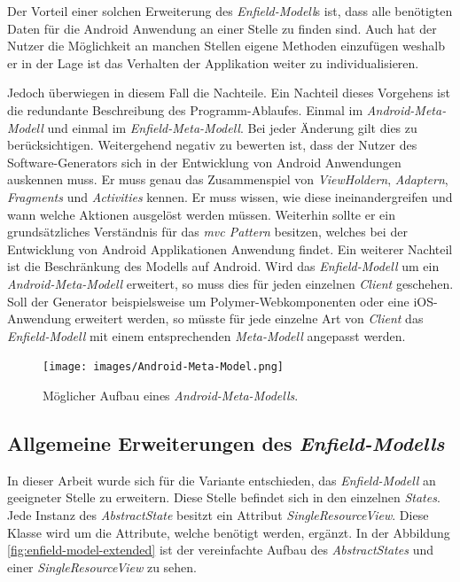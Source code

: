 \newpage

Der Vorteil einer solchen Erweiterung des \textit{Enfield-Modell}s ist, dass alle benötigten Daten für die Android Anwendung an einer Stelle zu finden sind. Auch hat der Nutzer die Möglichkeit an manchen Stellen eigene Methoden einzufügen weshalb er in der Lage ist das Verhalten der Applikation weiter zu individualisieren.

Jedoch überwiegen in diesem Fall die Nachteile. Ein Nachteil dieses Vorgehens ist die redundante Beschreibung des Programm-Ablaufes. Einmal im \textit{Android-Meta-Modell} und einmal im \textit{Enfield-Meta-Modell}. Bei jeder Änderung gilt dies zu berücksichtigen. 
Weitergehend negativ zu bewerten ist, dass der Nutzer des Software-Generators sich in der Entwicklung von Android Anwendungen auskennen muss. Er muss genau das Zusammenspiel von \textit{ViewHoldern}, \textit{Adaptern}, \textit{Fragments} und \textit{Activities} kennen. Er muss wissen, wie diese ineinandergreifen und wann welche Aktionen ausgelöst werden müssen. Weiterhin sollte er ein grundsätzliches Verständnis für das \textit{\acf{mvc} Pattern} besitzen, welches bei der Entwicklung von Android Applikationen Anwendung findet.
Ein weiterer Nachteil ist die Beschränkung des Modells auf Android. Wird das \textit{Enfield-Modell} um ein \textit{Android-Meta-Modell} erweitert, so muss dies für jeden einzelnen \textit{Client} geschehen. Soll der Generator beispielsweise um Polymer-Webkomponenten oder eine iOS-Anwendung erweitert werden, so müsste für jede einzelne Art von \textit{Client} das \textit{Enfield-Modell} mit einem entsprechenden \textit{Meta-Modell} angepasst werden.

\begin{figure}[H]
	\begin{center}
		\texttt{[image: images/Android-Meta-Model.png]}
		\caption{Möglicher Aufbau eines \textit{Android-Meta-Modells}.}
		\label{fig:android-model}
	\end{center}
\end{figure}

\subsection{Allgemeine Erweiterungen des \textit{Enfield-Modells}}\label{sec:generic_modell}

In dieser Arbeit wurde sich für die Variante entschieden, das \textit{Enfield-Modell} an geeigneter Stelle zu erweitern.
Diese Stelle befindet sich in den einzelnen \textit{States}. Jede Instanz des \textit{AbstractState} besitzt ein Attribut \textit{SingleResourceView}. Diese Klasse wird um die  Attribute, welche benötigt werden, ergänzt. In der Abbildung \ref{fig:enfield-model-extended} ist der vereinfachte Aufbau des \textit{AbstractStates} und einer \textit{SingleResourceView} zu sehen.


